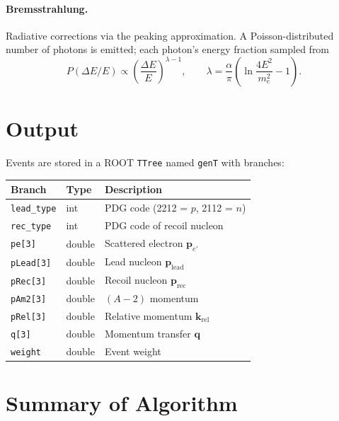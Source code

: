 \documentclass[11pt,a4paper]{article}
\newcommand{\vect}[1]{\bm{#1}}
\begin{document}
\paragraph{Bremsstrahlung.}
Radiative corrections via the peaking approximation.  A Poisson-distributed
number of photons is emitted; each photon's energy fraction sampled from
\begin{equation}
  P(\Delta E/E) \propto \left(\frac{\Delta E}{E}\right)^{\lambda - 1},
  \qquad
  \lambda = \frac{\alpha}{\pi}\left(\ln\frac{4E^{2}}{m_{e}^{2}} - 1\right).
\end{equation}

\section{Output}

Events are stored in a ROOT \texttt{TTree} named \texttt{genT} with branches:
\begin{center}
\begin{tabular}{lll}
\toprule
Branch & Type & Description \\
\midrule
\texttt{lead\_type} & int & PDG code (2212 = $p$, 2112 = $n$) \\
\texttt{rec\_type}  & int & PDG code of recoil nucleon \\
\texttt{pe[3]}      & double & Scattered electron $\vect{p}_{e'}$ \\
\texttt{pLead[3]}   & double & Lead nucleon $\vect{p}_{\text{lead}}$ \\
\texttt{pRec[3]}    & double & Recoil nucleon $\vect{p}_{\text{rec}}$ \\
\texttt{pAm2[3]}    & double & $(A{-}2)$ momentum \\
\texttt{pRel[3]}    & double & Relative momentum $\vect{k}_{\text{rel}}$ \\
\texttt{q[3]}       & double & Momentum transfer $\vect{q}$ \\
\texttt{weight}     & double & Event weight \\
\bottomrule
\end{tabular}
\end{center}

\section{Summary of Algorithm}
\end{document}
